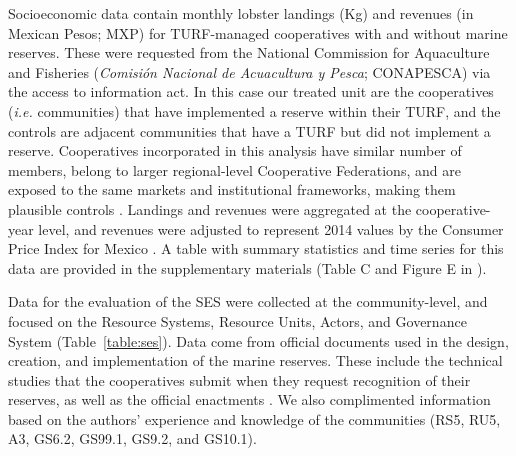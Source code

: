 \documentclass[10pt,letterpaper]{article}
\begin{document}
Socioeconomic data contain monthly lobster landings (Kg) and revenues (in Mexican Pesos; MXP) for TURF-managed cooperatives with and without marine reserves. These were requested from the National Commission for Aquaculture and Fisheries (\emph{Comisión Nacional de Acuacultura y Pesca}; CONAPESCA) via the access to information act. In this case our treated unit are the cooperatives (\emph{i.e.} communities) that have implemented a reserve within their TURF, and the controls are adjacent communities that have a TURF but did not implement a reserve. Cooperatives incorporated in this analysis have similar number of members, belong to larger regional-level Cooperative Federations, and are exposed to the same markets and institutional frameworks, making them plausible controls \cite{mccay_2014,mccay_2017,ayer_2018}. Landings and revenues were aggregated at the cooperative-year level, and revenues were adjusted to represent 2014 values by the Consumer Price Index for Mexico \cite{oecd_2017}. A table with summary statistics and time series for this data are provided in the supplementary materials (Table C and Figure E in ).

Data for the evaluation of the SES were collected at the community-level, and focused on the Resource Systems, Resource Units, Actors, and Governance System (Table~\ref{table:ses}). Data come from official documents used in the design, creation, and implementation of the marine reserves. These include the technical studies that the cooperatives submit when they request recognition of their reserves, as well as the official enactments \cite{dof_website_2012,dof_website_2013,dof_website_2018}. We also complimented information based on the authors' experience and knowledge of the communities (RS5, RU5, A3, GS6.2, GS99.1, GS9.2, and GS10.1).
\end{document}
